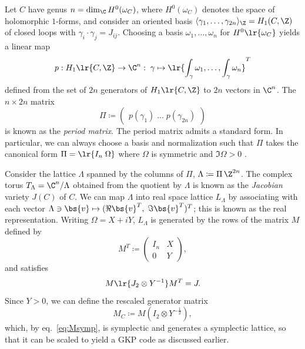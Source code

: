 \documentclass[a4paper, aps, pra, 11pt, onecolumn, tightenlines, superscriptaddress]{revtex4-2}
\begin{document}
Let $C$ have genus $n=\dim_{\C}H^0(\omega_C)$, where $H^0(\omega_C)$ denotes the space of holomorphic $1$-forms, and consider an oriented basis $\langle\gamma_1,\ldots,\gamma_{2n}\rangle_{\Z}=H_1(C,\Z)$ of closed loops with $\gamma_i\cdot\gamma_j=J_{ij}$.
%
Choosing a basis $\omega_1,\hdots, \omega_n$ for $H^0\lr{\omega_C}$ yields a linear map
\begin{equation}
    p: H_1\lr{C, \Z} \rightarrow \C^n :\; \gamma \mapsto \lr{\int_{\gamma} \omega_1, \hdots , \int_{\gamma} \omega_n}^T \label{eq:periods}
\end{equation}
defined from the set of $2n$ generators of $H_1\lr{C, \Z}$ to $2n$ vectors in $\C^n$. 
The $n \times 2n$ matrix 
\begin{equation}
    \Pi\coloneqq\begin{pmatrix} 
            p(\gamma_1)\; \hdots\; p(\gamma_{2n}) \label{eq:Jacobian}
        \end{pmatrix}
 \end{equation}
is known as the \emph{period matrix}. 
%
The period matrix admits a standard form. 
In particular, we can always choose a basis and normalization such that $\Pi$ takes the canonical form $\Pi=\lr{ I_n\; \Omega}$ where $\Omega$ is symmetric and $\Im \Omega > 0$ \cite[Sec.~8.1]{Birkenhake_2004}. 

Consider the lattice $\Lambda$ spanned by the columns of $\Pi$, $\Lambda\coloneqq\Pi\,\Z^{2n}$. 
The complex torus $T_{\Lambda} = \C^n/\Lambda$ obtained from the quotient by $\Lambda$ is known as the \emph{Jacobian} variety $J(C)$ of $C$. 
We can map $\Lambda$ into real space lattice $L_{\Lambda}$ by associating with each vector $\Lambda\ni\bs{v} \mapsto (\Re \bs{v}^T, \; \Im\bs{v}^T)^T$; this is known as the real representation. 
Writing $\Omega=X+iY$, $L_{\Lambda}$ is generated by the rows of the matrix $M$ defined by
\begin{equation}
M^T\coloneqq\begin{pmatrix}
I_n & X \\ 0 & Y
\end{pmatrix},
\end{equation} and satisfies
\begin{equation}
    M \lr{J_2 \otimes Y^{-1}} M^{T}=J.\label{eq:Msymp}
\end{equation}
Since $Y>0$, we can define the rescaled generator matrix
\begin{equation}
    M_C\coloneqq M(I_2\otimes Y^{-\frac{1}{2}}), \label{eq:MC}
\end{equation}
which, by eq.~\eqref{eq:Msymp}, is symplectic and generates a symplectic lattice, so that it can be scaled to yield a GKP code as discussed earlier.
\end{document}
